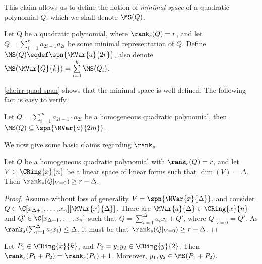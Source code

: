 This claim allows us to define the notion of \textit{minimal space} of a quadratic polynomial $Q$, which we shall denote $\MS(Q)$.
\begin{definition}\label{def:MS}
Let Q be a quadratic polynomial, where $\rank_s(Q) = r$, and let $Q = \sum \limits_{i=1}^r a_{2i-1}a_{2i}$ be some minimal representation of $Q$.
Define $\MS(Q)\eqdef \spn{\MVar{a}{2r}}$, also denote $\MS(\MVar{Q}{k}) = \sum \limits_{i=1}^k \MS(Q_i)$.
\end{definition}
\autoref{cla:irr-quad-span} shows that the minimal space is well defined. The following fact is easy to verify.

\begin{fact}\label{cor:containMS}
Let $Q=\sum_{i=1}^{m}a_{2i-1}\cdot a_{2i}$ be a homogeneous quadratic polynomial, then $\MS(Q)\subseteq \spn{\MVar{a}{2m}}$.
\end{fact}

We now give some basic claims regarding $\rank_s$.









\begin{claim}\label{cla:rank-mod-space}
Let $Q$ be a homogeneous quadratic polynomial with $\rank_s(Q)=r$, and let $V \subset \CRing{x}{n}$ be a linear space of linear forms such that $\dim(V)=\Delta$. Then $\rank_s(Q|_{V=0})\geq r-\Delta$.
\end{claim}
\begin{proof}
Assume  without loss of generality $V = \spn{\MVar{x}{\Delta}}$, and consider $Q\in \C[x_{\Delta+1},\ldots,x_n][\MVar{x}{\Delta}]$. There are $\MVar{a}{\Delta} \in \CRing{x}{n}$ and $Q' \in \C[x_{\Delta+1},\ldots,x_n]$ such that $Q = \sum_{i=1}^{\Delta} a_ix_i + Q'$, where $Q|_{V=0} = Q'$. As $\rank_s(\sum_{i=1}^{\Delta} a_ix_i ) \leq \Delta$, it must be that $\rank_s(Q|_{V=0}) \geq r-\Delta$.
\end{proof}

\begin{claim}\label{cla:ind-rank}
Let $P_1\in \CRing{x}{k}$, and $P_2 = y_1y_2\in \CRing{y}{2}$. Then $ \rank_s (P_1+P_2) = \rank_s(P_1) + 1$. Moreover, $y_1,y_2 \in \MS(P_1+P_2).$
\end{claim}

